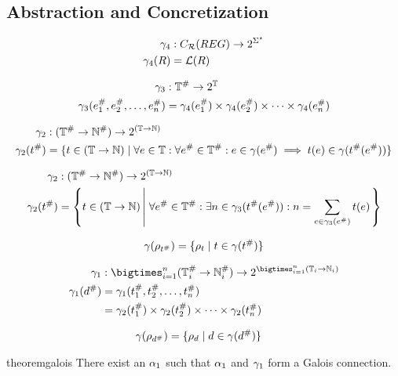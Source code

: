 \subsection{Abstraction and Concretization}\label{subsec:abstraction-and-concretization}

\begin{align}
    \gamma_4 &: C_{\mathcal{R}}(REG) \rightarrow 2^{\Sigma^\star} \\
    \gamma_4(R) &= \mathcal{L}(R)
\end{align}

\begin{align}
    \gamma_3 &: \mathbb{T}^\# \rightarrow 2^\mathbb{T} \\
    \gamma_3 (e_1^\#, e_2^\#, \dots, e_n^\#) &= \gamma_4(e_1^\#) \times \gamma_4(e_2^\#) \times \dots \times \gamma_4(e_n^\#)
\end{align}

\begin{align}
    \gamma_2 &: (\mathbb{T}^\# \rightarrow \mathbb{N}^\#) \rightarrow 2^{(\mathbb{T} \rightarrow \mathbb{N})} \\
    \gamma_2(t^\#) &= \{t \in (\mathbb{T} \rightarrow \mathbb{N}) \mid \forall e \in \mathbb{T} : \forall e^\# \in \mathbb{T}^\# : e \in \gamma(e^\#) \implies t(e) \in \gamma(t^\#(e^\#))\}
\end{align}

\begin{align}
    \gamma_2 &: (\mathbb{T}^\# \rightarrow \mathbb{N}^\#) \rightarrow 2^{(\mathbb{T} \rightarrow \mathbb{N})} \\
    \gamma_2 (t^\#) &= \left\{ t \in (\mathbb{T} \rightarrow \mathbb{N}) \left|\; \forall e^\# \in \mathbb{T}^\# : \exists n \in \gamma_3(t^\#(e^\#)) : n = \sum_{e \in \gamma_3(e^\#)} t(e) \right. \right\}
\end{align}

\begin{align}
    \gamma(\rho_{t^\#}) = \{ \rho_{t} \mid t \in \gamma(t^\#) \}
\end{align}

\begin{align}
    \concrete_1 &: \bigtimes_{i = 1}^{n} (\mathbb{T}^\#_i \rightarrow \mathbb{N}^\#_i) \rightarrow 2^{\bigtimes_{i = 1}^{n} (\mathbb{T}_i \rightarrow \mathbb{N}_i)} \\
    \concrete_1(d^\#) &= \concrete_1(t_1^\#, t_2^\#, \dots, t_n^\#) \\
                    &= \concrete_2(t_1^\#) \times \concrete_2(t_2^\#) \times \dots \times \concrete_2(t_n^\#)
\end{align}

\begin{align}
    \gamma(\rho_{d^\#}) &= \{ \rho_{d} \mid d \in \gamma(d^\#) \}
\end{align}

\begin{restatable}{theorem}{galois}\label{thm:galios}
    There exist an $\alpha_1$ such that $\alpha_1$ and $\gamma_1$ form a Galois connection.
\end{restatable}
